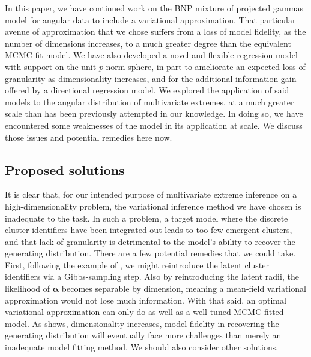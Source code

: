 In this paper, we have continued work on the BNP mixture of projected gammas model for angular data 
    to include a variational approximation.  That particular avenue of approximation that we chose
    suffers from a loss of model fidelity, as the number of dimensions increases, to a much greater
    degree than the equivalent MCMC-fit model. We have also developed a novel and flexible regression
    model with support on the unit $p$-norm sphere, in part to ameliorate an expected loss of granularity
    as dimensionality increases, and for the additional information gain offered by a directional
    regression model.   We explored the application of said models to the angular distribution of 
    multivariate extremes, at a much greater scale than has been previously attempted in our knowledge.  
    In doing so, we have encountered some weaknesses of the model in its application at scale.  We 
    discuss those issues and potential remedies here now.

\subsection{Proposed solutions}
It is clear that, for our intended purpose of multivariate extreme inference on a high-dimensionality
    problem, the variational inference method we have chosen is inadequate to the task.  In such a
    problem, a target model where the discrete cluster identifiers have been integrated out leads to too
    few emergent clusters, and that lack of granularity is detrimental to the model's ability to recover
    the generating distribution.  There are a few potential remedies that we could take.  First, following
    the example of \cite{Loaizamaya2022}, we might reintroduce the latent cluster identifiers via a 
    Gibbs-sampling step.  Also by reintroducing the latent radii, the likelihood of $\bm{\alpha}$ becomes
    separable by dimension, meaning a mean-field variational approximation would not lose much information.
    With that said, an optimal variational approximation can only do as well as a well-tuned MCMC fitted
    model.  As \cite{chandra2023} shows, dimensionality increases, model fidelity in recovering the 
    generating distribution will eventually face more challenges than merely an inadequate model fitting 
    method.  We should also consider other solutions.


